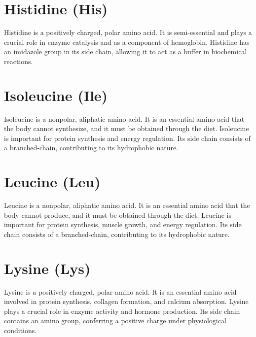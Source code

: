 \documentclass{article}
\begin{document}
\section*{Histidine (His)}
Histidine is a positively charged, polar amino acid. It is semi-essential and plays a crucial role in enzyme catalysis and as a component of hemoglobin. Histidine has an imidazole group in its side chain, allowing it to act as a buffer in biochemical reactions.
\begin{center}
\end{center}

\section*{Isoleucine (Ile)}
Isoleucine is a nonpolar, aliphatic amino acid. It is an essential amino acid that the body cannot synthesize, and it must be obtained through the diet. Isoleucine is important for protein synthesis and energy regulation. Its side chain consists of a branched-chain, contributing to its hydrophobic nature.
\begin{center}
\end{center}
\section*{Leucine (Leu)}
Leucine is a nonpolar, aliphatic amino acid. It is an essential amino acid that the body cannot produce, and it must be obtained through the diet. Leucine is important for protein synthesis, muscle growth, and energy regulation. Its side chain consists of a branched-chain, contributing to its hydrophobic nature.
\begin{center}
\end{center}

\section*{Lysine (Lys)}
Lysine is a positively charged, polar amino acid. It is an essential amino acid involved in protein synthesis, collagen formation, and calcium absorption. Lysine plays a crucial role in enzyme activity and hormone production. Its side chain contains an amino group, conferring a positive charge under physiological conditions.
\begin{center}
\end{center}
\end{document}

